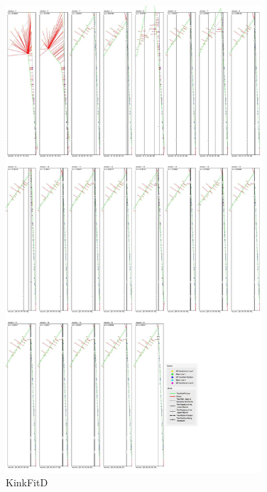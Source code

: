 \begin{figure}[h!]
  \centering
    \includegraphics[width=0.85\textwidth]{Chapter4/Figs/KinkFit_D.jpg}
    \caption{KinkFitD}\label{fig:KinkFitD}
\end{figure}

